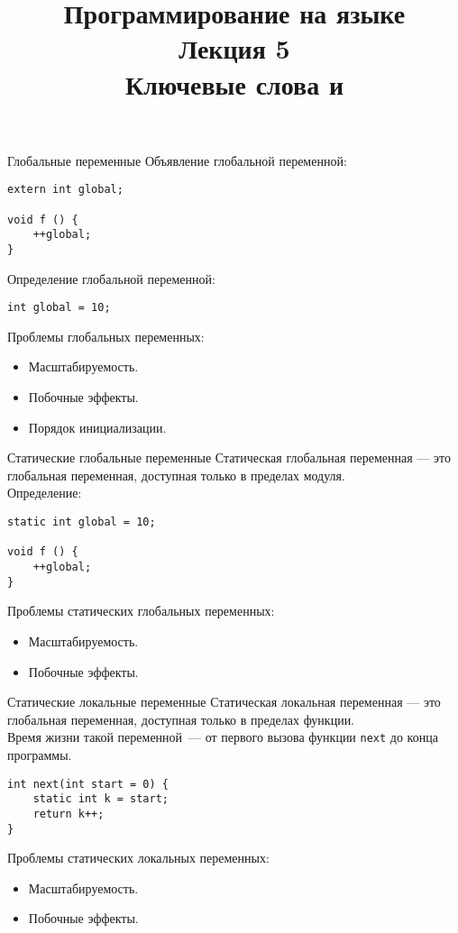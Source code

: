 \documentclass{beamer}
\title{{\bf Программирование на языке \langcpp\protect\\Лекция
5\protect\vspace{1em}\\}Ключевые слова \code{static} и \code{inline}}
\begin{document}
\begin{frame} 
  \titlepage
\end{frame}

\begin{frame}[fragile]{Глобальные переменные}
Объявление глобальной переменной:
    \begin{lstlisting}
extern int global;

void f () {
    ++global; 
}
    \end{lstlisting}

Определение глобальной переменной:
    \begin{lstlisting}
int global = 10;
    \end{lstlisting}

Проблемы глобальных переменных:
\begin{itemize}
    \item Масштабируемость.
    \item Побочные эффекты.
    \item Порядок инициализации.
\end{itemize}
\end{frame}

\begin{frame}[fragile]{Статические глобальные переменные}
    Статическая глобальная переменная — это глобальная переменная,
    доступная только в пределах модуля.\\[1em]
Определение: 
    \begin{lstlisting}
static int global = 10;

void f () {
    ++global; 
}
    \end{lstlisting}
                
Проблемы статических глобальных переменных:
\begin{itemize}
    \item Масштабируемость.
    \item Побочные эффекты.
\end{itemize}
\end{frame}

\begin{frame}[fragile]{Статические локальные переменные}
    Статическая локальная переменная — это глобальная переменная,
    доступная только в пределах функции.\\[1em]
Время жизни такой переменной~--- от первого вызова функции {\tt next}
до конца программы.
    \begin{lstlisting}
int next(int start = 0) {
    static int k = start;
    return k++;
}
    \end{lstlisting}
                
Проблемы статических локальных переменных:
\begin{itemize}
    \item Масштабируемость.
    \item Побочные эффекты.
\end{itemize}
\end{frame}
\end{document}
